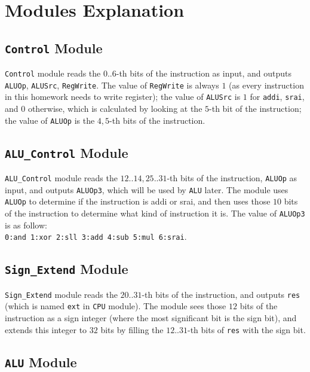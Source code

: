 \section{Modules Explanation}

\subsection{\texttt{Control} Module}

\texttt{Control} module reads the $0..6$-th bits of the instruction as input, and outputs \texttt{ALUOp}, \texttt{ALUSrc}, \texttt{RegWrite}. The value of \texttt{RegWrite} is always $1$ (as every instruction in this homework needs to write register); the value of \texttt{ALUSrc} is $1$ for \texttt{addi}, \texttt{srai}, and $0$ otherwise, which is calculated by looking at the $5$-th bit of the instruction; the value of \texttt{ALUOp} is the $4, 5$-th bits of the instruction.

\subsection{\texttt{ALU\_Control} Module}

\texttt{ALU\_Control} module reads the $12..14, 25..31$-th bits of the instruction, \texttt{ALUOp} as input, and outputs \texttt{ALUOp3}, which will be used by \texttt{ALU} later. The module uses \texttt{ALUOp} to determine if the instruction is addi or srai, and then uses those $10$ bits of the instruction to determine what kind of instruction it is. The value of \texttt{ALUOp3} is as follow:\\
\texttt{0:and 1:xor 2:sll 3:add 4:sub 5:mul 6:srai}.

\subsection{\texttt{Sign\_Extend} Module}

\texttt{Sign\_Extend} module reads the $20..31$-th bits of the instruction, and outputs \texttt{res} (which is named \texttt{ext} in \texttt{CPU} module). The module sees those $12$ bits of the instruction as a sign integer (where the most significant bit is the sign bit), and extends this integer to $32$ bits by filling the $12..31$-th bits of \texttt{res} with the sign bit.

\subsection{\texttt{ALU} Module}

